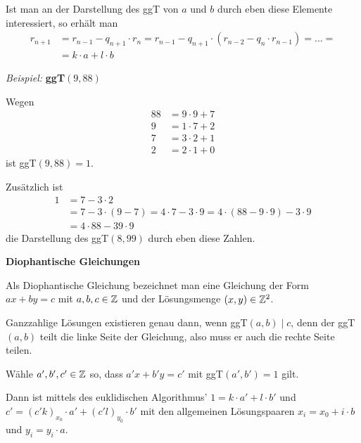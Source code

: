     Ist man an der Darstellung des ggT von $a$ und $b$ durch eben diese Elemente interessiert, so erhält man
    \begin{align*}
        r_{n+1} & = r_{n-1} - q_{n+1} \cdot r_n = r_{n-1} - q_{n+1} \cdot (r_{n-2} - q_n \cdot r_{n-1}) = \ldots = \\
        & = k\cdot a + l\cdot b
    \end{align*}

\textit{Beispiel:} \textbf{ggT$(9,88)$}

    Wegen 
    \begin{align*}
        88 & = 9 \cdot 9 + 7\\
        9 & = 1 \cdot 7 + 2\\
        7 & = 3 \cdot 2 + 1\\
        2 & = 2 \cdot 1 + 0
    \end{align*}
    ist ggT$(9,88)=1$.
    
    Zusätzlich ist
    \begin{align*}
        1 & = 7 - 3 \cdot 2\\
        & = 7 - 3 \cdot (9 - 7) = 4 \cdot 7 - 3 \cdot 9 = 4 \cdot (88 - 9 \cdot 9) - 3 \cdot 9\\
        & = 4 \cdot 88 - 39 \cdot 9
    \end{align*}
    die Darstellung des ggT$(8,99)$ durch eben diese Zahlen.\par\medskip

    \textbf{Diophantische Gleichungen}

    Als Diophantische Gleichung bezeichnet man eine Gleichung der Form $ax + by = c$ mit $a,b,c\in \mathbb{Z}$ und der Lösungsmenge $(x,y) \in \mathbb{Z}^2$.

    Ganzzahlige Lösungen existieren genau dann, wenn ggT$(a,b) \mid c$, denn der ggT$(a,b)$ teilt die linke Seite der Gleichung, also muss er auch die rechte Seite teilen.

    Wähle $a',b',c'\in \mathbb{Z}$ so, dass $a'x + b'y = c'$ mit ggT$(a', b') = 1$ gilt.

    Dann ist mittels des euklidischen Algorithmus' $1 = k \cdot a' + l \cdot b'$ und $c' = {(c'k)}_{x_0} \cdot a' + {(c'l)}_{y_0} \cdot b'$ mit
    den allgemeinen Lösungspaaren $x_i=x_0 + i\cdot b$ und $y_i=y_i\cdot a$.


